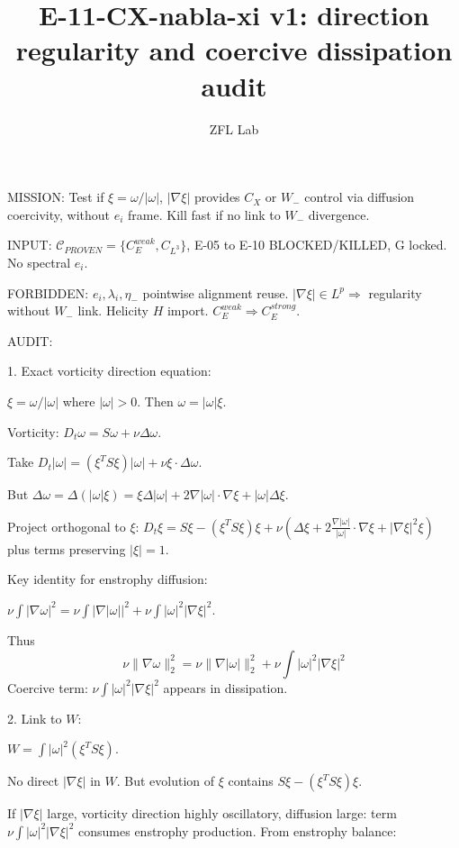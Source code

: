 \documentclass[11pt]{article}
\title{E-11-CX-nabla-xi v1: direction regularity and coercive dissipation audit}
\author{ZFL Lab}
\begin{document}
\maketitle

MISSION: Test if $\xi=\omega/|\omega|$, $|\nabla\xi|$ provides $C_X$ or $W_-$ control via diffusion coercivity, without $e_i$ frame. Kill fast if no link to $W_-$ divergence.

INPUT: $\mathcal{C}_{PROVEN}=\{C_E^{weak},C_{L^3}\}$, E-05 to E-10 BLOCKED/KILLED, G locked. No spectral $e_i$.

FORBIDDEN:
$e_i,\lambda_i,\eta_-$ pointwise alignment reuse.
$|\nabla\xi|\in L^p\Rightarrow$ regularity without $W_-$ link.
Helicity $H$ import.
$C_E^{weak}\Rightarrow C_E^{strong}$.

AUDIT:

1. Exact vorticity direction equation:

$\xi=\omega/|\omega|$ where $|\omega|>0$. Then $\omega=|\omega|\xi$.

Vorticity: $D_t\omega=S\omega+\nu\Delta\omega$.

Take $D_t|\omega| = (\xi^T S\xi)|\omega| + \nu\xi\cdot\Delta\omega$.

But $\Delta\omega = \Delta(|\omega|\xi)= \xi\Delta|\omega|+2\nabla|\omega|\cdot\nabla\xi+|\omega|\Delta\xi$.

Project orthogonal to $\xi$: $D_t\xi = S\xi-(\xi^T S\xi)\xi + \nu(\Delta\xi+2\frac{\nabla|\omega|}{|\omega|}\cdot\nabla\xi + |\nabla\xi|^2\xi)$ plus terms preserving $|\xi|=1$.

Key identity for enstrophy diffusion:

$\nu\int |\nabla\omega|^2 = \nu\int |\nabla|\omega||^2 + \nu\int |\omega|^2|\nabla\xi|^2$.

Thus
\begin{equation*}
\boxed{\nu\|\nabla\omega\|_2^2 = \nu\|\nabla|\omega|\|_2^2 + \nu\int |\omega|^2|\nabla\xi|^2}
\end{equation*}
Coercive term: $\nu\int |\omega|^2|\nabla\xi|^2$ appears in dissipation.

2. Link to $W$:

$W=\int |\omega|^2 (\xi^T S\xi)$.

No direct $|\nabla\xi|$ in $W$. But evolution of $\xi$ contains $S\xi-(\xi^T S\xi)\xi$.

If $|\nabla\xi|$ large, vorticity direction highly oscillatory, diffusion large: term $\nu\int|\omega|^2|\nabla\xi|^2$ consumes enstrophy production. From enstrophy balance:
\end{document}
